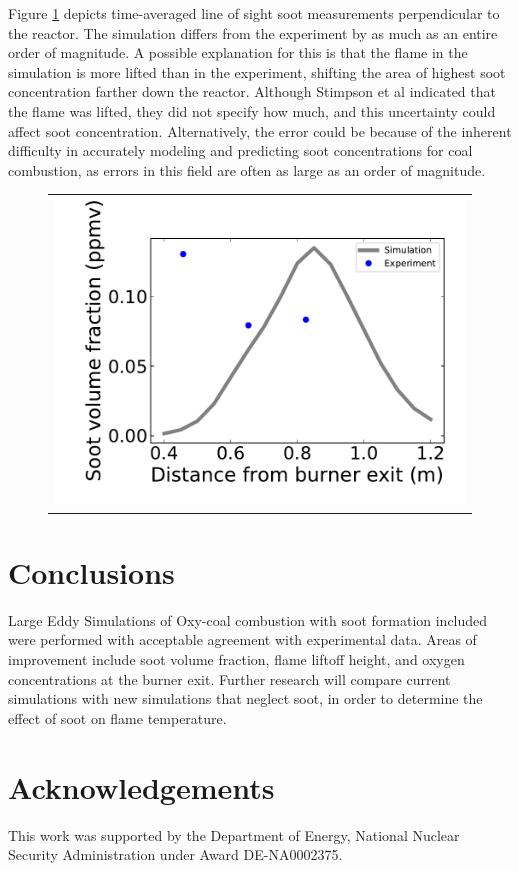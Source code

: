 \documentclass[12pt]{wssci}
\begin{document}
 



Figure \ref{f:fvplot} depicts time-averaged line of sight soot measurements perpendicular to the reactor.  The simulation differs from the experiment by as much as an entire order of magnitude.  A possible explanation for this is that the flame in the simulation is more lifted than in the experiment, shifting the area of highest soot concentration farther down the reactor.  Although Stimpson et al \cite{Stimpson2013} indicated that the flame was lifted, they did not specify how much, and this uncertainty could affect soot concentration.  Alternatively, the error could be because of the inherent difficulty in accurately modeling and predicting soot concentrations for coal combustion, as errors in this field are often as large as an order of magnitude. 

\begin{figure}[!h]
\begin{center}
\begin{tabular}{c}
\includegraphics[width=4 in]{../figures/fv_plot/fv_plot.pdf}
\end{tabular}
\caption{   }
\label{f:fvplot}
\end{center}
\end{figure}


\section{Conclusions}
%
	Large Eddy Simulations of Oxy-coal combustion with soot formation included were performed with acceptable agreement with experimental data.  Areas of improvement include soot volume fraction, flame liftoff height, and oxygen concentrations at the burner exit.  Further research will compare current simulations with new simulations that neglect soot, in order to determine the effect of soot on flame temperature.



\section{Acknowledgements}
This work was supported by the Department of Energy, National Nuclear Security Administration under Award DE-NA0002375.


\printbibliography
\end{document}
